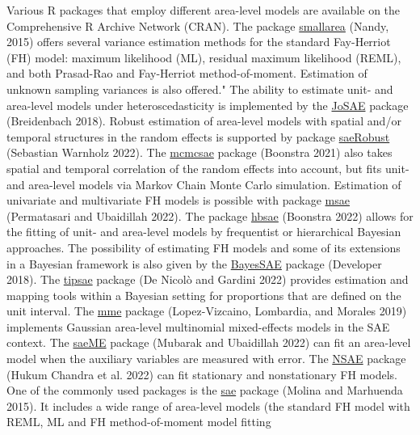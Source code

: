 Various R packages that employ different area-level models are available
on the Comprehensive R Archive Network (CRAN). The package
\href{https://CRAN.R-project.org/package=smallarea}{smallarea} (Nandy, 2015)
offers several variance estimation methods for the standard Fay-Herriot
(FH) model: maximum likelihood (ML), residual maximum likelihood (REML),
and both Prasad-Rao and Fay-Herriot method-of-moment. Estimation of
unknown sampling variances is also offered." The ability to estimate
unit- and area-level models under heteroscedasticity is implemented by
the \href{https://CRAN.R-project.org/package=JoSAE}{JoSAE} package
(Breidenbach 2018). Robust estimation of area-level models with spatial
and/or temporal structures in the random effects is supported by package
\href{https://CRAN.R-project.org/package=saeRobust}{saeRobust}
(Sebastian Warnholz 2022). The
\href{https://CRAN.R-project.org/package=mcmcsae}{mcmcsae} package
(Boonstra 2021) also takes spatial and temporal correlation of the
random effects into account, but fits unit- and area-level models via
Markov Chain Monte Carlo simulation. Estimation of univariate and
multivariate FH models is possible with package
\href{https://CRAN.R-project.org/package=msae}{msae} (Permatasari and Ubaidillah 2022). The
package \href{https://CRAN.R-project.org/package=hbsae}{hbsae}
(Boonstra 2022) allows for the fitting of unit- and area-level models by
frequentist or hierarchical Bayesian approaches. The possibility of
estimating FH models and some of its extensions in a Bayesian framework
is also given by the
\href{https://CRAN.R-project.org/package=BayesSAE}{BayesSAE} package
(Developer 2018). The
\href{https://CRAN.R-project.org/package=tipsae}{tipsae} package
(De Nicolò and Gardini 2022) provides estimation and mapping tools within a Bayesian
setting for proportions that are defined on the unit interval. The
\href{https://CRAN.R-project.org/package=mme}{mme} package (Lopez-Vizcaino, Lombardia, and Morales 2019)
implements Gaussian area-level multinomial mixed-effects models in the
SAE context. The \href{https://CRAN.R-project.org/package=saeME}{saeME}
package (Mubarak and Ubaidillah 2022) can fit an area-level model when the auxiliary
variables are measured with error. The
\href{https://CRAN.R-project.org/package=NSAE}{NSAE} package (Hukum Chandra et al. 2022)
can fit stationary and nonstationary FH models. One of the commonly used
packages is the \href{https://CRAN.R-project.org/package=sae}{sae} package
(Molina and Marhuenda 2015). It includes a wide range of area-level models (the
standard FH model with REML, ML and FH method-of-moment model fitting
